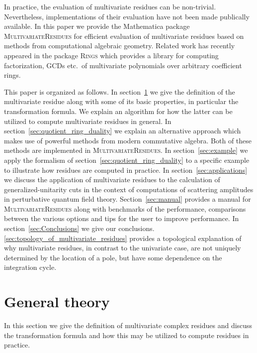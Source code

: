 \documentclass[dvipsnames,preprint,12pt,sort&compress]{elsarticle}
\begin{document}
In practice, the evaluation of multivariate residues can be non-trivial.
Nevertheless, implementations of their evaluation have not been made
publically available. In this paper we provide the Mathematica package
\textsc{MultivariateResidues} for efficient evaluation of multivariate residues based
on methods from computational algebraic geometry.
Related work has recently appeared in the package \textsc{Rings} \cite{Poslavsky:2017sne}
which provides a library for computing factorization, GCDs etc.~of multivariate polynomials
over arbitrary coefficient rings.

This paper is organized as follows. In section~\ref{sec:General_theory}
we give the definition of the multivariate residue along with some of its basic
properties, in particular the transformation formula. We explain an algorithm
for how the latter can be utilized to compute multivariate residues in general. In
section~\ref{sec:quotient_ring_duality} we explain an alternative approach which
makes use of powerful methods from modern commutative algebra. Both of these methods
are implemented in \textsc{MultivariateResidues}. In section~\ref{sec:example} we
apply the formalism of section~\ref{sec:quotient_ring_duality} to a specific example
to illustrate how residues are computed in practice.
In section~\ref{sec:applications} we discuss the application of multivariate residues
to the calculation of generalized-unitarity cuts in the context of computations
of scattering amplitudes in perturbative quantum field theory. Section~\ref{sec:manual} provides a manual
for \textsc{MultivariateResidues} along with benchmarks of the performance,
comparisons between the various options and tips for the user to improve performance.
In section~\ref{sec:Conclusions} we give our conclusions.
\ref{sec:topology_of_multivariate_residues} provides a topological explanation
of why multivariate residues, in contrast to the univariate case, are
not uniquely determined by the location of a pole, but have some dependence on the
integration cycle.


\section{General theory}\label{sec:General_theory}

In this section we give the definition of multivariate complex
residues and discuss the transformation formula and how this may
be utilized to compute residues in practice.
\end{document}
